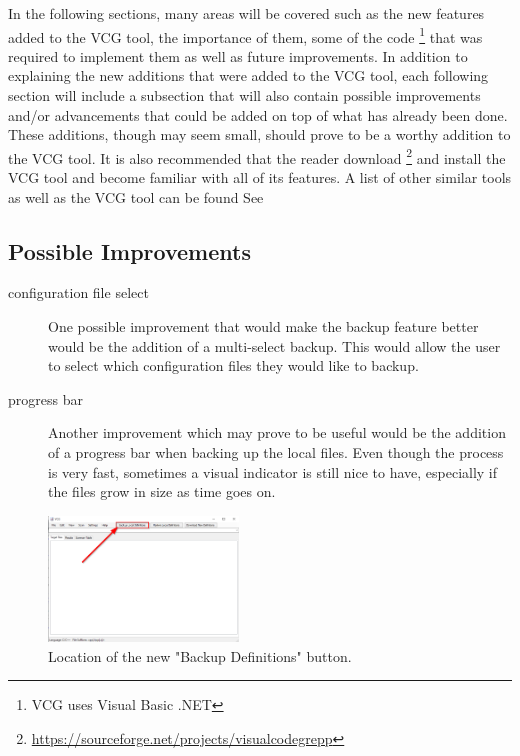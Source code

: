 \documentclass[letterpaper,twocolumn,10pt]{article}
\begin{document}
In the following sections, many areas will be covered such as the new features added to the VCG tool, the importance of them, some of the code%
\footnote{VCG uses Visual Basic .NET} that was required to implement them as well as future improvements. In addition to explaining the new additions that were added to the VCG tool, each following section will include a subsection that will also contain possible improvements and/or advancements that could be added on top of what has already been done. These additions, though may seem small, should prove to be a worthy addition to the VCG tool. It is also recommended that the reader download%
\footnote{\url{https://sourceforge.net/projects/visualcodegrepp}} and install the VCG tool and become familiar with all of its features. A list of other similar tools as well as the VCG tool can be found See 

\subsection{Possible Improvements}
\begin{description}
\item[configuration file select] One possible improvement that would make the backup feature better would be the addition of a multi-select backup. This would allow the user to select which configuration files they would like to backup. 
\item[progress bar] Another improvement which may prove to be useful would be the addition of a progress bar when backing up the local files. Even though the process is very fast, sometimes a visual indicator is still nice to have, especially if the files grow in size as time goes on.
\end{description}

\begin{figure}[h]
\centering
\includegraphics[width=0.45\textwidth]{backup}
\caption{\label{fig:backup}Location of the new "Backup Definitions" button.}
\end{figure}




\end{document}
